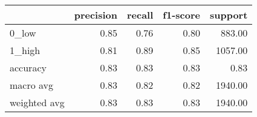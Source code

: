 \begin{tabular}{lrrrr}
\toprule
{} &  precision &  recall &  f1-score &  support \\
\midrule
0\_low        &       0.85 &    0.76 &      0.80 &   883.00 \\
1\_high       &       0.81 &    0.89 &      0.85 &  1057.00 \\
accuracy     &       0.83 &    0.83 &      0.83 &     0.83 \\
macro avg    &       0.83 &    0.82 &      0.82 &  1940.00 \\
weighted avg &       0.83 &    0.83 &      0.83 &  1940.00 \\
\bottomrule
\end{tabular}

